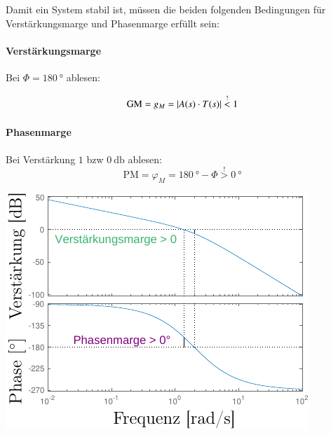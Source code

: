 \smallskip
Damit ein System stabil ist, müssen die beiden folgenden Bedingungen für Verstärkungsmarge und Phasenmarge erfüllt sein:


\begin{minipage}[t]{0.48\columnwidth}
    \paragraph{Verstärkungsmarge}

    Bei $\Phi = \qty{180}{\degree}$ ablesen:

    \[
        \text{GM} = g_M = \left|A(s) \cdot T(s)\right| \overset{!}{<} 1
    \]

    \smallskip

    \paragraph{Phasenmarge}

    Bei Verstärkung $1$ bzw  $\qty{0}{\decibel}$ ablesen:
    \[
        \text{PM} = \varphi_M = \qty{180}{\degree} - \Phi \overset{!}{>} \qty{0}{\degree}
    \]
\end{minipage}
\hfill
\begin{minipage}[t]{0.48\columnwidth}
    \includegraphics[width=\columnwidth, align=t]{images/10_bode_plot_V2.pdf}
\end{minipage}




